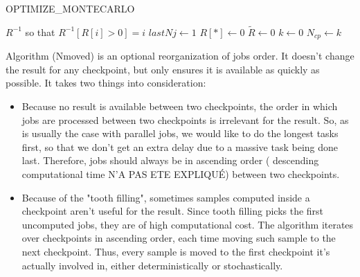 \documentclass[./thesis.tex]{subfiles}
\begin{document}
\begin{algorithm}
	\caption{OPTIMIZE\_MONTECARLO}
	\label{OPTIMIZE_MONTECARLO}
	
	
		$R^{-1}$ so that $R^{-1}[R[i] > 0] = i$ \;
		$lastNj \gets 1$ \;
		$R[*] \gets 0$ \;
		$\tilde R \gets 0$ \;
		$k \gets 0$ \;		
		$N_{cp} \gets k$ \;
\end{algorithm}

Algorithm (Nmoved) is an optional reorganization of jobs order. It doesn't change the result for any checkpoint, but only ensures it is available as quickly as possible. It takes two things into consideration:
\begin{itemize}
\item
Because no result is available between two checkpoints, the order in which jobs are processed between two checkpoints is irrelevant for the result. So, as is usually the case with parallel jobs, we would like to do the longest tasks first, so that we don't get an extra delay due to a massive task being done last. Therefore, jobs should always be in ascending order ( descending computational time N'A PAS ETE EXPLIQUÉ) between two checkpoints.
\item
Because of the "tooth filling", sometimes samples computed inside a checkpoint aren't useful for the result. Since tooth filling picks the first uncomputed jobs, they are of high computational cost. The algorithm iterates over checkpoints in ascending order, each time moving such sample to the next checkpoint. Thus, every sample is moved to the first checkpoint it's actually involved in, either deterministically or stochastically.
\end{itemize}
\end{document}
